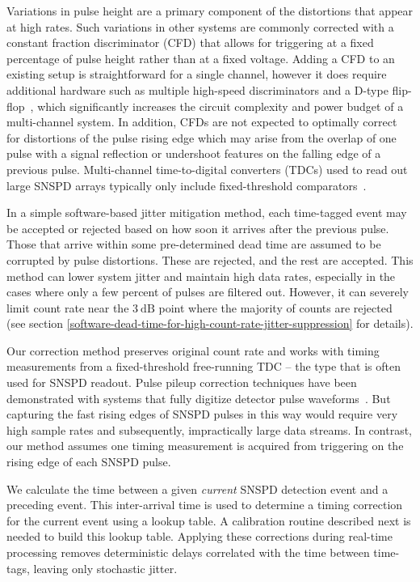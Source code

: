 \documentclass[11pt]{caltech_thesis} %
\begin{document}
Variations in pulse height are a primary component of the distortions that appear at high rates. Such variations in other systems are commonly corrected with a constant fraction discriminator (CFD) that allows for triggering at a fixed percentage of pulse height rather than at a fixed voltage. Adding a CFD to an existing setup is straightforward for a single channel, however it does require additional hardware such as multiple high-speed discriminators and a D-type flip-flop~\autocite{Becker2005}, which significantly increases the circuit complexity and power budget of a multi-channel system. In addition, CFDs are not expected to optimally correct for distortions of the pulse rising edge which may arise from the overlap of one pulse with a signal reflection or undershoot features on the falling edge of a previous pulse. Multi-channel time-to-digital converters (TDCs) used to read out large SNSPD arrays typically only include fixed-threshold comparators~\autocite{Wollman2019}.

In a simple software-based jitter mitigation method, each time-tagged event may be accepted or rejected based on how soon it arrives after the previous pulse. Those that arrive within some pre-determined dead time are assumed to be corrupted by pulse distortions. These are rejected, and the rest are accepted. This method can lower system jitter and maintain high data rates, especially in the cases where only a few percent of pulses are filtered out. However, it can severely limit count rate near the $3~\mathrm{dB}$ point where the majority of counts are rejected (see section \ref{software-dead-time-for-high-count-rate-jitter-suppression} for details).

Our correction method preserves original count rate and works with timing measurements from a fixed-threshold free-running TDC -- the type that is often used for SNSPD readout. Pulse pileup correction techniques have been demonstrated with systems that fully digitize detector pulse waveforms~\autocite{Behbahani2019,scoullar_evans_2009,Haselman2010}. But capturing the fast rising edges of SNSPD pulses in this way would require very high sample rates and subsequently, impractically large data streams. In contrast, our method assumes one timing measurement is acquired from triggering on the rising edge of each SNSPD pulse.

We calculate the time between a given \emph{current} SNSPD detection event and a preceding event. This inter-arrival time is used to determine a timing correction for the current event using a lookup table. A calibration routine described next is needed to build this lookup table. Applying these corrections during real-time processing removes deterministic delays correlated with the time between time-tags, leaving only stochastic jitter.
\end{document}
